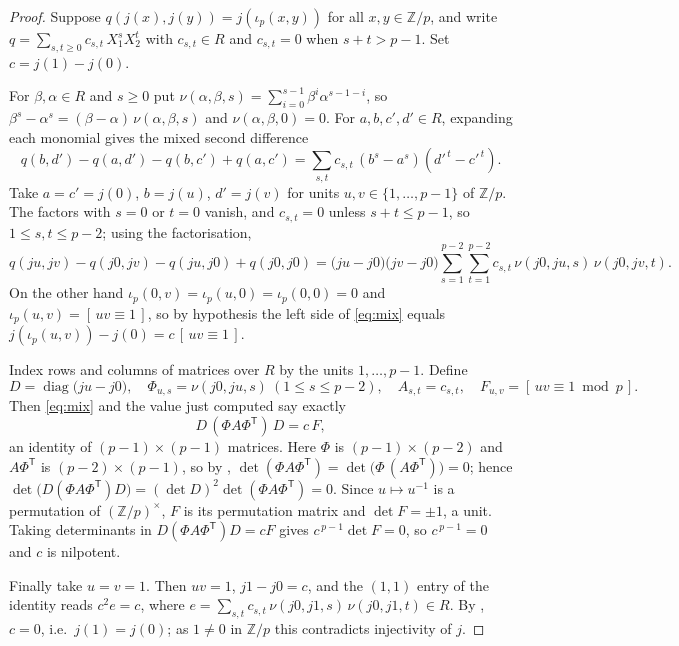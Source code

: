 \begin{proof}\leanok{}
Suppose $q(j(x),j(y)) = j(\iota_p(x,y))$ for all $x,y \in \mathbb{Z}/p$, and write
$q = \sum_{s,t \ge 0} c_{s,t}\, X_1^{s} X_2^{t}$ with $c_{s,t} \in R$ and $c_{s,t} = 0$ when
$s+t > p-1$. Set $c = j(1) - j(0)$.

For $\beta, \alpha \in R$ and $s \ge 0$ put $\nu(\alpha,\beta,s) = \sum_{i=0}^{s-1}
\beta^{i}\alpha^{s-1-i}$, so $\beta^{s} - \alpha^{s} = (\beta-\alpha)\,\nu(\alpha,\beta,s)$ and
$\nu(\alpha,\beta,0) = 0$. For $a,b,c',d' \in R$, expanding each monomial gives the mixed
second difference
\[
  q(b,d') - q(a,d') - q(b,c') + q(a,c')
  = \sum_{s,t} c_{s,t}\,(b^{s}-a^{s})(d'^{\,t}-c'^{\,t}).
\]
Take $a = c' = j(0)$, $b = j(u)$, $d' = j(v)$ for units $u,v \in \{1,\dots,p-1\}$ of
$\mathbb{Z}/p$. The factors with $s = 0$ or $t = 0$ vanish, and $c_{s,t} = 0$ unless
$s+t \le p-1$, so $1 \le s,t \le p-2$; using the factorisation,
\begin{equation}\label{eq:mix}
  q(j u, j v) - q(j 0, j v) - q(j u, j 0) + q(j 0, j 0)
  = \bigl(j u - j 0\bigr)\bigl(j v - j 0\bigr)
    \sum_{s=1}^{p-2}\sum_{t=1}^{p-2} c_{s,t}\,\nu(j0, ju, s)\,\nu(j0, jv, t). \tag{$\dagger$}
\end{equation}
On the other hand $\iota_p(0,v) = \iota_p(u,0) = \iota_p(0,0) = 0$ and $\iota_p(u,v) =
[\,uv \equiv 1\,]$, so by hypothesis the left side of \eqref{eq:mix} equals
$j(\iota_p(u,v)) - j(0) = c\,[\,uv\equiv 1\,]$.

Index rows and columns of matrices over $R$ by the units $1,\dots,p-1$. Define
\[
  D = \operatorname{diag}\bigl(j u - j 0\bigr), \quad
  \Phi_{u,s} = \nu(j0, ju, s)\ (1 \le s \le p-2), \quad
  A_{s,t} = c_{s,t}, \quad
  F_{u,v} = [\,uv \equiv 1 \bmod p\,].
\]
Then \eqref{eq:mix} and the value just computed say exactly
\[
  D\,(\Phi A \Phi^{\mathsf T})\,D = c\,F ,
\]
an identity of $(p-1)\times(p-1)$ matrices. Here $\Phi$ is $(p-1)\times(p-2)$ and
$A\Phi^{\mathsf T}$ is $(p-2)\times(p-1)$, so by ,
$\det(\Phi A \Phi^{\mathsf T}) = \det\bigl(\Phi\,(A\Phi^{\mathsf T})\bigr) = 0$; hence
$\det\bigl(D(\Phi A\Phi^{\mathsf T})D\bigr) = (\det D)^2 \det(\Phi A\Phi^{\mathsf T}) = 0$.
Since $u \mapsto u^{-1}$ is a permutation of $(\mathbb{Z}/p)^\times$, $F$ is its permutation
matrix and $\det F = \pm 1$, a unit. Taking determinants in $D(\Phi A\Phi^{\mathsf T})D = cF$
gives $c^{\,p-1}\det F = 0$, so $c^{\,p-1} = 0$ and $c$ is nilpotent.

Finally take $u = v = 1$. Then $uv = 1$, $j 1 - j 0 = c$, and the $(1,1)$ entry of the
identity reads $c^2 e = c$, where $e = \sum_{s,t} c_{s,t}\,\nu(j0,j1,s)\,\nu(j0,j1,t) \in R$.
By , $c = 0$, i.e.\ $j(1) = j(0)$; as $1 \ne 0$ in $\mathbb{Z}/p$ this
contradicts injectivity of $j$.
\end{proof}

